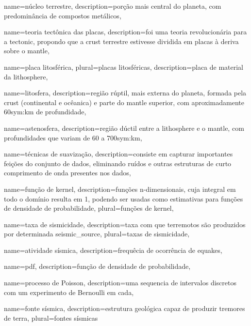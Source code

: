{
	name={n{ú}cleo terrestre},
	description={por{ç}{ã}o mais central do planeta, com predomin{â}ncia de compostos metálicos},
}

{
	name={teoria tect{ô}nica das placas},
	description={foi uma teoria revolucionária para a \gls{tectonic},
				propondo que a \gls{crust} terrestre estivesse dividida 
				em placas {à} deriva sobre o \gls{mantle}},
}


{
	name={placa litosf{é}rica},
	plural={placas litosf{é}ricas},
	description={placa de material da \gls{lithosphere}},
}


{
	name={litosfera},
	description={região rúptil, mais externa do planeta, formada pela \gls{crust} 
		(continental e ocêanica) e parte do \gls{mantle} superior, com aproximadamente 
		60\gls*{sym:km} de profundidade},
}


{
	name={astenosfera},
	description={região dúctil entre a \gls{lithosphere} e o \gls{mantle},
				com profundidades que variam de 60 a 700\gls*{sym:km}},
}

{
	name={técnicas de suavização},
	description={consiste em capturar importantes feições do conjunto de dados,
				 eliminando ruídos e outras estruturas de curto comprimento de onda
				 presentes nos dados},
}

{
	name={função de kernel},
	description={funções n-dimensionais, cuja integral em todo o domínio resulta em 1,
				 podendo ser usadas como estimativas para 
				 funções de densidade de probabilidade},
	plural={funções de kernel},
}

{
	name={taxa de sismicidade},
	description={taxa com que terremotos são produzidos por determinada \gls{seismic_source}},
	plural={taxas de sismicidade},
}

{
	name={atividade sísmica},
	description={frequ{ê}cia de ocorr{ê}ncia de \glspl{equake}},
}

{
	name={pdf},
	description={função de densidade de probabilidade},
}

{
	name={processo de Poisson},
	description={uma sequencia de intervalos discretos com um experimento de Bernoulli em cada},
}

{
	name={fonte sísmica},
	description={estrutura geológica capaz de produzir tremores de terra},
	plural={fontes sísmicas}
}

